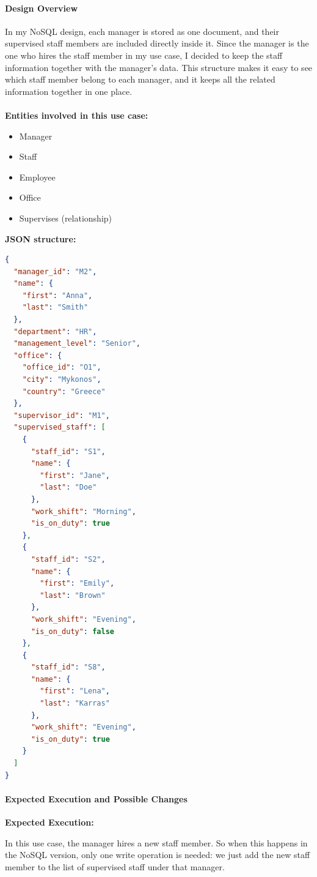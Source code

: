 \documentclass[a4paper, 11pt]{article}          %
\begin{document}
\paragraph*{Design Overview}
\noindent
In my NoSQL design, each manager is stored as one document, and their supervised staff members are included directly inside it. Since the manager is the one who hires the staff member in my use case, I decided to keep the staff information together with the manager’s data. This structure makes it easy to see which staff member belong to each manager, and it keeps all the related information together in one place.
\\
\\
\textbf{Entities involved in this use case:}
\begin{itemize}
    \item Manager
    \item Staff
    \item Employee
    \item Office
    \item Supervises (relationship)
\end{itemize}
\newpage
\noindent
\textbf{JSON structure:}
\\
\begin{lstlisting}[language=json, caption= MongoDB Data Structure Design]
{
  "manager_id": "M2",
  "name": {
    "first": "Anna",
    "last": "Smith"
  },
  "department": "HR",
  "management_level": "Senior",
  "office": {
    "office_id": "O1",
    "city": "Mykonos",
    "country": "Greece"
  },
  "supervisor_id": "M1",
  "supervised_staff": [
    {
      "staff_id": "S1",
      "name": {
        "first": "Jane",
        "last": "Doe"
      },
      "work_shift": "Morning",
      "is_on_duty": true
    },
    {
      "staff_id": "S2",
      "name": {
		"first": "Emily",
        "last": "Brown"
      },
      "work_shift": "Evening",
      "is_on_duty": false
    },
    {
      "staff_id": "S8",
      "name": {
        "first": "Lena",
        "last": "Karras"
      },
      "work_shift": "Evening",
      "is_on_duty": true
    }
  ]
}
\end{lstlisting}

\newpage
\paragraph*{Expected Execution and Possible Changes}
\noindent
\textbf{Expected Execution:}
\par
In this use case, the manager hires a new staff member. So when this happens in the NoSQL version, only one write operation is needed: we just add the new staff member to the list of supervised staff under that manager.
\end{document}
